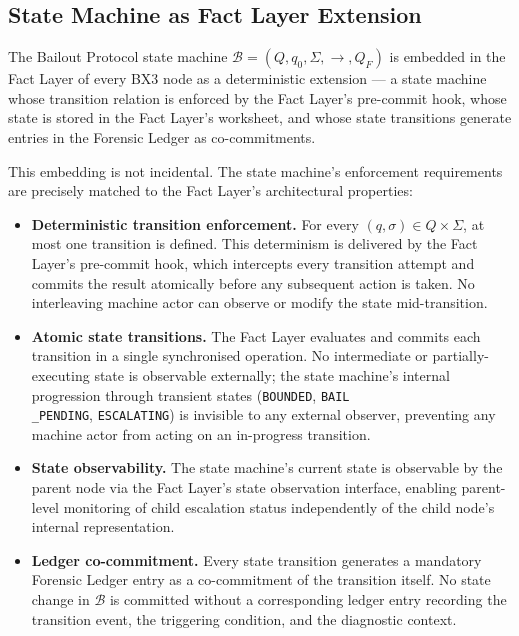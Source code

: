 \subsection{State Machine as Fact Layer Extension}
\label{sec:state-machine-extension}

The Bailout Protocol state machine $\mathcal{B} = (Q, q_0, \Sigma, \rightarrow, Q_F)$ is embedded in the Fact Layer of every BX3 node as a deterministic extension — a state machine whose transition relation is enforced by the Fact Layer's pre-commit hook, whose state is stored in the Fact Layer's worksheet, and whose state transitions generate entries in the Forensic Ledger as co-commitments.

This embedding is not incidental. The state machine's enforcement requirements are precisely matched to the Fact Layer's architectural properties:

\begin{itemize}\itemsep=0pt
  \item[(\textit{i})] \textbf{Deterministic transition enforcement.} For every $(q, \sigma) \in Q \times \Sigma$, at most one transition is defined. This determinism is delivered by the Fact Layer's pre-commit hook, which intercepts every transition attempt and commits the result atomically before any subsequent action is taken. No interleaving machine actor can observe or modify the state mid-transition.
  \item[(\textit{ii})] \textbf{Atomic state transitions.} The Fact Layer evaluates and commits each transition in a single synchronised operation. No intermediate or partially-executing state is observable externally; the state machine's internal progression through transient states (\texttt{BOUNDED}, \texttt{BAIL\\_PENDING}, \texttt{ESCALATING}) is invisible to any external observer, preventing any machine actor from acting on an in-progress transition.
  \item[(\textit{iii})] \textbf{State observability.} The state machine's current state is observable by the parent node via the Fact Layer's state observation interface, enabling parent-level monitoring of child escalation status independently of the child node's internal representation.
  \item[(\textit{iv})] \textbf{Ledger co-commitment.} Every state transition generates a mandatory Forensic Ledger entry as a co-commitment of the transition itself. No state change in $\mathcal{B}$ is committed without a corresponding ledger entry recording the transition event, the triggering condition, and the diagnostic context.
\end{itemize}

